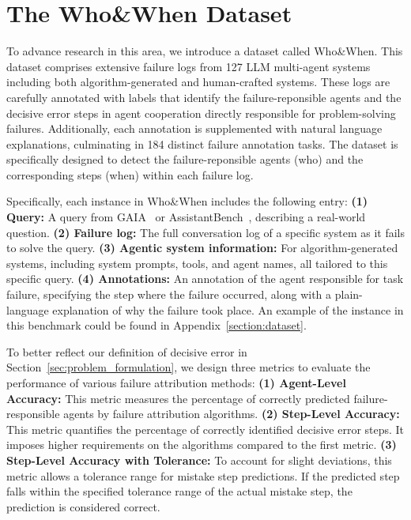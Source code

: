 \section{The Who\&When Dataset}
\label{sec_dataset}

To advance research in this area, we introduce a dataset called Who\&When. 
This dataset comprises extensive
failure logs from 127 LLM multi-agent systems including both algorithm-generated and human-crafted systems.
These logs are carefully annotated with labels that identify the failure-reponsible agents and the decisive error steps in agent cooperation directly responsible for problem-solving failures. Additionally, each annotation is supplemented with natural language explanations, culminating in 184 distinct failure annotation tasks.
The dataset is specifically designed to detect the failure-reponsible agents (who) and the corresponding steps (when) within each failure log. 

Specifically, each instance in Who\&When includes the following entry:
\textbf{(1) Query:} A query from GAIA~\citep{mialon2023gaia} or AssistantBench~\citep{yoran2024assistantbench}, describing a real-world question.
\textbf{(2) Failure log:} The full conversation log of a specific system as it fails to solve the query.
\textbf{(3) Agentic system information:} For algorithm-generated systems, including system prompts, tools, and agent names, all tailored to this specific query. 
\textbf{(4) Annotations:} An annotation of the agent responsible for task failure, specifying the step where the failure occurred, along with a plain-language explanation of why the failure took place.
An example of the instance in this benchmark could be found in Appendix~\ref{section:dataset}.

To better reflect our definition of decisive error in Section~\ref{sec:problem_formulation}, 
we design three metrics to evaluate the performance of various failure attribution methods:
\textbf{(1) Agent-Level Accuracy:} This metric measures the percentage of correctly predicted failure-responsible agents by failure attribution algorithms.
\textbf{(2) Step-Level Accuracy:} This metric quantifies the percentage of correctly identified decisive error steps. It imposes higher requirements on the algorithms compared to the first metric.
\textbf{(3) Step-Level Accuracy with Tolerance:} To account for slight deviations, this metric allows a tolerance range for mistake step predictions. If the predicted step falls within the specified tolerance range of the actual mistake step, the prediction is considered correct. 

